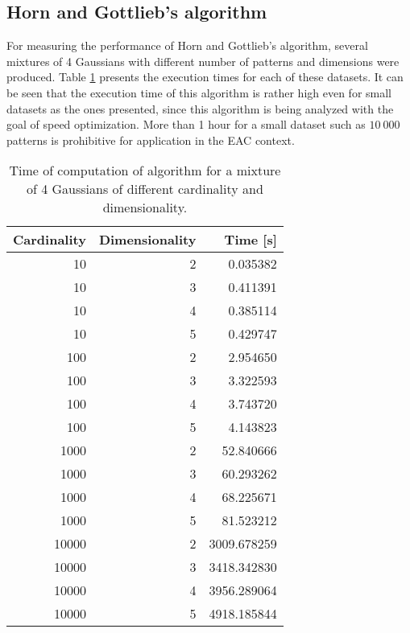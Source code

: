 



\subsection{Horn and Gottlieb's algorithm}

For measuring the performance of Horn and Gottlieb's algorithm, several mixtures of 4 Gaussians with different number of patterns and dimensions were produced. %
Table \ref{tab:horn performance} presents the execution times for each of these datasets.
It can be seen that the execution time of this algorithm is rather high even for small datasets as the ones presented, since this algorithm is being analyzed with the goal of speed optimization.
More than 1 hour for a small dataset such as $10 \: 000$ patterns is prohibitive for application in the EAC context.

\begin{table}[h]
\centering
\caption{Time of computation of \citet{Horn2001b} algorithm for a mixture of 4 Gaussians of different cardinality and dimensionality.}

\begin{tabular}{rrr}
\toprule
 Cardinality &  Dimensionality &     Time [s] \\
\midrule
          10 &               2 &     0.035382 \\
          10 &               3 &     0.411391 \\
          10 &               4 &     0.385114 \\
          10 &               5 &     0.429747 \\
         100 &               2 &     2.954650 \\
         100 &               3 &     3.322593 \\
         100 &               4 &     3.743720 \\
         100 &               5 &     4.143823 \\
        1000 &               2 &    52.840666 \\
        1000 &               3 &    60.293262 \\
        1000 &               4 &    68.225671 \\
        1000 &               5 &    81.523212 \\
       10000 &               2 &  3009.678259 \\
       10000 &               3 &  3418.342830 \\
       10000 &               4 &  3956.289064 \\
       10000 &               5 &  4918.185844 \\
\bottomrule
\end{tabular}

\label{tab:horn performance}
\end{table}


